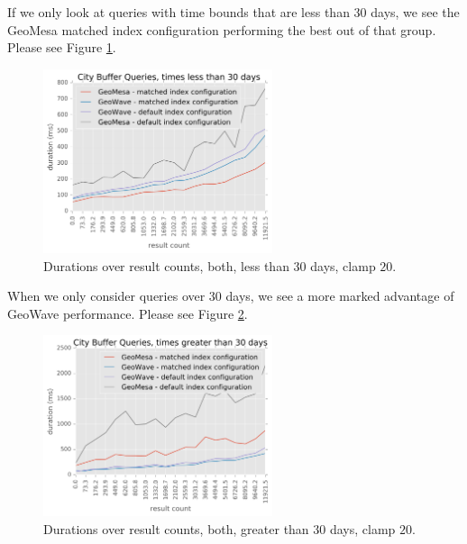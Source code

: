 If we only look at queries with time bounds that are less than 30 days, we see the GeoMesa matched index configuration
performing the best out of that group.
Please see Figure \ref{matchinglt3020}.

\begin{figure}[h!tb]
  \centering
  \includegraphics[width=0.60\textwidth]{../docs/img/gdelt/lt-30days-duration-vs-result-both-cap-20.png}
  \caption{Durations over result counts, both, less than $30$ days, clamp $20$.}
  \label{matchinglt3020}
\end{figure}

When we only consider queries over 30 days, we see a more marked advantage of GeoWave performance.
Please see Figure \ref{matchinggt3020}.

\begin{figure}[h!tb]
  \centering
  \includegraphics[width=0.60\textwidth]{../docs/img/gdelt/gt-30days-duration-vs-result-both-cap-20.png}
  \caption{Durations over result counts, both, greater than $30$ days, clamp $20$.}
  \label{matchinggt3020}
\end{figure}


